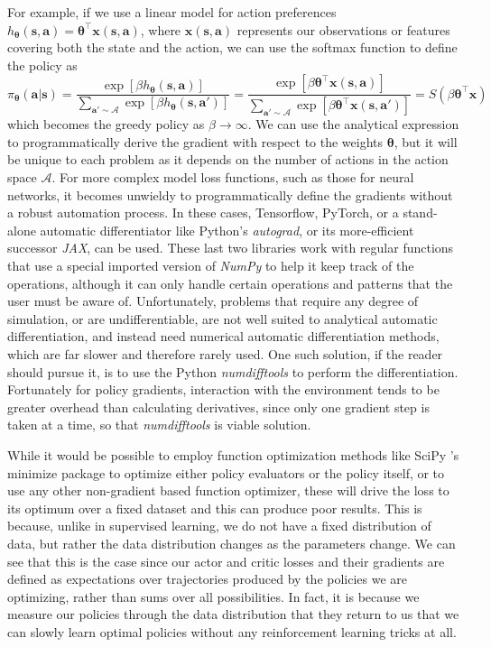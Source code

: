 \documentclass{article}
\begin{document}
For example, if we use a linear model for action preferences $h_{\boldsymbol{\theta}}(\mathbf{s},\mathbf{a})=\boldsymbol{\theta}^\top\mathbf{x}(\mathbf{s},\mathbf{a})$, where $\mathbf{x}(\mathbf{s},\mathbf{a})$ represents our observations or features covering both the state and the action, we can use the softmax function to define the policy as \begin{equation}\pi_{\boldsymbol{\theta}}(\mathbf{a}|\mathbf{s})=\frac{\exp[\beta h_{\boldsymbol{\theta}}(\mathbf{s},\mathbf{a})]}{\sum_{\mathbf{a}'\sim\mathcal{A}}\exp[\beta h_{\boldsymbol{\theta}}(\mathbf{s},\mathbf{a}')]}=\frac{\exp[\beta \boldsymbol{\theta}^\top\mathbf{x}(\mathbf{s},\mathbf{a})]}{\sum_{\mathbf{a}'\sim\mathcal{A}}\exp[\beta \boldsymbol{\theta}^\top\mathbf{x}(\mathbf{s},\mathbf{a}')]}=S(\beta \boldsymbol{\theta}^\top\mathbf{x})\end{equation}which becomes the greedy policy as $\beta\rightarrow \infty$. We can use the analytical expression to programmatically derive the gradient with respect to the weights $\boldsymbol{\theta}$, but it will be unique to each problem as it depends on the number of actions in the action space $\mathcal{A}$. For more complex model loss functions, such as those for neural networks, it becomes unwieldy to programmatically define the gradients without a robust automation process. In these cases, Tensorflow, PyTorch, or a stand-alone automatic differentiator like Python's \textit{autograd}, or its more-efficient successor \textit{JAX}, can be used. These last two libraries work with regular functions that use a special imported version of \textit{NumPy} to help it keep track of the operations, although it can only handle certain operations and patterns that the user must be aware of. Unfortunately, problems that require any degree of simulation, or are undifferentiable, are not well suited to analytical automatic differentiation, and instead need numerical automatic differentiation methods, which are far slower and therefore rarely used. One such solution, if the reader should pursue it, is to use the Python \textit{numdifftools} to perform the differentiation. Fortunately for policy gradients, interaction with the environment tends to be greater overhead than calculating derivatives, since only one gradient step is taken at a time, so that \textit{numdifftools} is viable solution.

While it would be possible to employ function optimization methods like SciPy 's minimize package to optimize either policy evaluators or the policy itself, or to use any other non-gradient based function optimizer, these will drive the loss to its optimum over a fixed dataset and this can produce poor results. This is because, unlike in supervised learning, we do not have a fixed distribution of data, but rather the data distribution changes as the parameters change. We can see that this is the case since our actor and critic losses and their gradients are defined as expectations over trajectories produced by the policies we are optimizing, rather than sums over all possibilities. In fact, it is because we measure our policies through the data distribution that they return to us that we can slowly learn optimal policies without any reinforcement learning tricks at all. 
\end{document}
